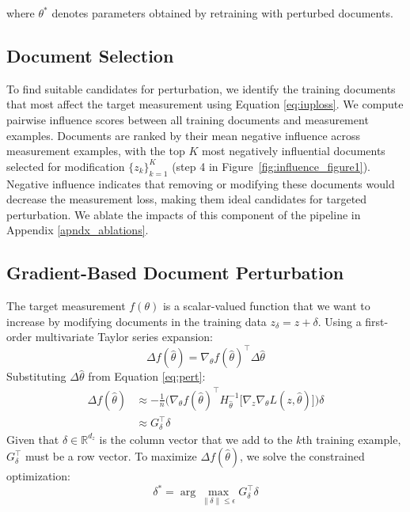 \documentclass{article}
\theoremstyle{plain}
\theoremstyle{definition}
\theoremstyle{remark}
\begin{document}
where $\theta^*$ denotes parameters obtained by retraining with perturbed documents.

\subsection{Document Selection}

To find suitable candidates for perturbation, we identify the training documents that most affect the target measurement using Equation \ref{eq:iuploss}.
We compute pairwise influence scores between all training documents and measurement examples. Documents are ranked by their mean negative influence across measurement examples, with the top $K$ most negatively influential documents selected for modification $\{z_k\}_{k=1}^K$ (step 4 in Figure~\ref{fig:influence_figure1}). Negative influence indicates that removing or modifying these documents would decrease the measurement loss, making them ideal candidates for targeted perturbation. We ablate the impacts of this component of the pipeline in Appendix \ref{apndx_ablations}.

\subsection{Gradient-Based Document Perturbation}

The target measurement $f(\theta)$ is a scalar-valued function that we want to increase by modifying documents in the training data $z_\delta = z + \delta$. Using a first-order multivariate Taylor series expansion:
\begin{equation}
    \Delta f(\hat\theta) = \nabla_\theta f( \hat\theta )^\top \Delta\hat\theta
\end{equation}
Substituting $\Delta\hat\theta$ from Equation \ref{eq:pert}:
\begin{align}
    \Delta f(\hat\theta) &\approx -\frac{1}{n} \Big( \nabla_\theta f( \hat\theta )^\top 
     H_{\hat{\theta}}^{-1} \big[ \nabla_z \nabla_\theta L(z, \hat\theta)\big]\Big)\delta\\
     &\approx G_\delta^\top \delta
\end{align}
Given that $\delta \in \mathbb{R}^{d_z}$ is the column vector that we add to the $k$th training example,  $G_\delta^\top$ must be a row vector. To maximize $\Delta f(\hat\theta)$, we solve the constrained optimization:
\begin{equation}
\delta^* = \arg\max_{\|\delta\| \leq \epsilon} G_\delta^\top \delta
\end{equation}
\end{document}
